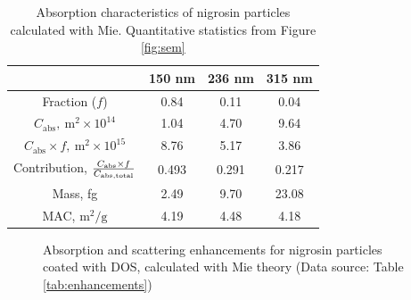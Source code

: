 \documentclass[12pt]{article}
\begin{document}
\begin{table}[!h]
    \centering
    \caption{Absorption characteristics of nigrosin particles calculated with Mie. Quantitative statistics from Figure \ref{fig:sem}}
    \begin{tabular}{c c c c}
        \hline
        & 150 nm & 236 nm & 315 nm \\
        \hline
        Fraction ($f$) & 0.84 & 0.11 & 0.04 \\
        $C_{\mathrm{abs}},\ \mathrm{m}^2\times10^{14}$ & 1.04 & 4.70 & 9.64 \\
        $C_{\mathrm{abs}}\times f,\ \mathrm{m}^2\times10^{15}$ & 8.76 & 5.17 & 3.86 \\
        Contribution, $C_{\mathrm{abs}}\times f\over C_{\mathrm{abs,total}}$ & 0.493 & 0.291 & 0.217 \\
        Mass, fg & 2.49 & 9.70 & 23.08 \\
        MAC, $\mathrm{m}^2/\mathrm{g}$ & 4.19 & 4.48 & 4.18 \\
        \hline
    \end{tabular}
    \label{tab:absorption}
\end{table}

\begin{figure}[!h]
    \centering
    \caption{Absorption and scattering enhancements for nigrosin particles coated with DOS, calculated with Mie theory (Data source: Table \ref{tab:enhancements})}
    \label{fig:enhancements}
\end{figure}
\end{document}
